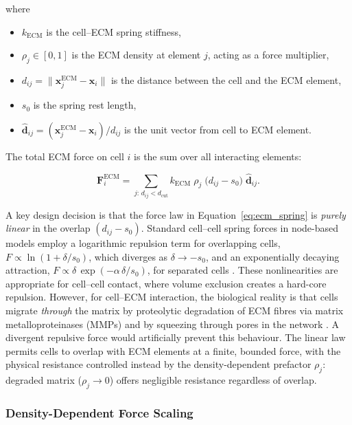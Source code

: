 \noindent where
\begin{itemize}
    \item $k_{\text{ECM}}$ is the cell--ECM spring stiffness,
    \item $\rho_j \in [0,1]$ is the ECM density at element $j$, acting as a force multiplier,
    \item $d_{ij} = \lVert \mathbf{x}_j^{\text{ECM}} - \mathbf{x}_i \rVert$ is the distance between the cell and the ECM element,
    \item $s_0$ is the spring rest length,
    \item $\hat{\mathbf{d}}_{ij} = (\mathbf{x}_j^{\text{ECM}} - \mathbf{x}_i) / d_{ij}$ is the unit vector from cell to ECM element.
\end{itemize}

\noindent The total ECM force on cell $i$ is the sum over all interacting elements:

\begin{equation}
    \mathbf{F}_i^{\text{ECM}} = \sum_{j:\, d_{ij} < d_{\text{cut}}} k_{\text{ECM}}\;\rho_j\;\bigl(d_{ij} - s_0\bigr)\;\hat{\mathbf{d}}_{ij}.
    \label{eq:ecm_total}
\end{equation}

A key design decision is that the force law in Equation~\eqref{eq:ecm_spring} is \emph{purely linear} in the overlap $(d_{ij} - s_0)$.
Standard cell--cell spring forces in node-based models employ a logarithmic repulsion term for overlapping cells, $F \propto \ln(1 + \delta/s_0)$, which diverges as $\delta \to -s_0$, and an exponentially decaying attraction, $F \propto \delta\,\exp(-\alpha\,\delta/s_0)$, for separated cells \cite{Meineke2001}.
These nonlinearities are appropriate for cell--cell contact, where volume exclusion creates a hard-core repulsion.
However, for cell--ECM interaction, the biological reality is that cells migrate \emph{through} the matrix by proteolytic degradation of ECM fibres via matrix metalloproteinases (MMPs) and by squeezing through pores in the network \cite{Wolf2013}.
A divergent repulsive force would artificially prevent this behaviour.
The linear law permits cells to overlap with ECM elements at a finite, bounded force, with the physical resistance controlled instead by the density-dependent prefactor $\rho_j$: degraded matrix ($\rho_j \to 0$) offers negligible resistance regardless of overlap.

\subsubsection{Density-Dependent Force Scaling}


